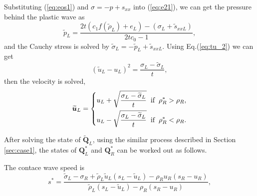 \documentclass{article}
\numberwithin{equation}{section}
\numberwithin{table}{section}
\begin{document}
Substituting (\ref{eq:eos1}) and $\sigma=-p +s_{xx}$ into (\ref{eq:e21}), we can get the pressure behind the plastic wave as
\begin{equation}
  \widetilde{p}_L= \frac{2t(c_1f(\widetilde{\rho}_L)+e_L)-(\sigma_L+\widetilde{s}_{xxL})}{2tc_0-1},
\end{equation}
and the Cauchy stress is solved by $\widetilde{\sigma}_L = -\widetilde{p}_L+\widetilde{s}_{xxL}$. Using Eq.(\ref{eq:tu_2}) we can get
\begin{equation}
  (\widetilde{u}_L-u_L)^2 = \frac{\sigma_L-\widetilde{\sigma}_L}{t},
\end{equation}
then the velocity is solved,
\begin{equation}
  \widetilde{\bm{u}}_L= \left\{
  \begin{aligned}
	u_L+\sqrt{\frac{\sigma_L-\widetilde{\sigma}_L}{t}} \hspace{0.2cm} \text{if} \hspace{0.2cm} \rho_R^* >\rho_R,\\
	u_L-\sqrt{\frac{\sigma_L-\widetilde{\sigma}_L}{t}} \hspace{0.2cm} \text{if} \hspace{0.2cm} \rho_R^* <\rho_R.\\
\end{aligned} \right.
\end{equation}

After solving  the state of $\widetilde{\bm{Q}}_L$,  using the similar process described in Section \ref{sec:case1}, the states of $\bm{Q}_L^*$ and $\bm{Q}_R^*$ can be worked out as follows.

The contace wave speed is
\begin{equation}
  s^* = \frac{\widetilde{\sigma}_L-\sigma_R+\widetilde{\rho}_L \widetilde{u}_L(s_L-\widetilde{u}_L)-\rho_R u_R(s_R-u_R)}{\widetilde{\rho}_L(s_L-\widetilde{u}_L)-\rho_R(s_R-u_R)},
\end{equation}
\end{document}
